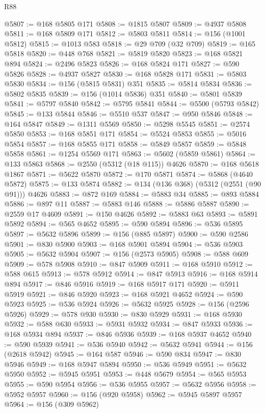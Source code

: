 \begin{lexlean}{R88}
\begin{coremodule}
@5807 := @168 @5805 @171
@5808 := @1815 @5807
@5809 := @4937 @5808
@5811 := @168 @5809 @171
@5812 := @5803 @5811
@5814 := @156 (@1001 @5812)
@5815 := @1013 @583
@5818 := @29 @709 (@32 @709)
@5819 := @165 @5818
@5820 := @448 @768
@5821 := @5819 @5820
@5823 := @168 @5821 @894
@5824 := @2496 @5823
@5826 := @168 @5824 @171
@5827 := @590 @5826
@5828 := @4937 @5827
@5830 := @168 @5828 @171
@5831 := @5803 @5830
@5834 := @156 (@5815 @5831) @351
@5835 := @5814 @5834
@5836 := @5802 @5835
@5839 := @156 (@1014 @5836) @351
@5840 := @5801 @5839
@5841 := @5797 @5840
@5842 := @5795 @5841
@5844 := @5500 (@5793 @5842)
@5845 := @133 @5844
@5846 := @5510 @537
@5847 := @950 @5846
@5848 := @164 @5847
@5849 := @1311 @5569
@5850 := @5298 @5545
@5851 := @2574 @5850
@5853 := @168 @5851 @171
@5854 := @5524 @5853
@5855 := @5016 @5854
@5857 := @168 @5855 @171
@5858 := @5849 @5857
@5859 := @5848 @5858
@5861 := @1254 @5569 @171
@5863 := @5602 (@5859 @5861)
@5864 := @133 @5863
@5868 := @2550 (@5312 (@18 @115)) @4626
@5870 := @168 @5618 @1867
@5871 := @5622 @5870
@5872 := @170 @5871
@5874 := @5868 (@4640 @5872)
@5875 := @133 @5874
@5882 := @134 (@136 @368) (@5312 (@2551 (@90 @91))) @4626
@5883 := @872 @169
@5884 := @5883 @34
@5885 := @893 @5884
@5886 := @897 @11
@5887 := @5883 @146
@5888 := @5886 @5887
@5890 := @2559 @17 @4609
@5891 := @150 @4626
@5892 := @5883 @63
@5893 := @5891 @5892
@5894 := @565 @4652
@5895 := @590 @5894
@5896 := @536 @5895
@5897 := @5632 @5896
@5899 := @156 (@885 @5897)
@5900 := @590 @2586
@5901 := @830 @5900
@5903 := @168 @5901 @5894
@5904 := @536 @5903
@5905 := @5632 @5904
@5907 := @156 (@2573 @5905)
@5908 := @588 @609
@5909 := @578 @5908
@5910 := @847 @5909
@5911 := @168 @5910
@5912 := @588 @615
@5913 := @578 @5912
@5914 := @847 @5913
@5916 := @168 @5914 @894
@5917 := @846 @5916
@5919 := @168 @5917 @171
@5920 := @5911 @5919
@5921 := @846 @5920
@5923 := @168 @5921 @4652
@5924 := @590 @5923
@5925 := @536 @5924
@5926 := @5632 @5925
@5928 := @156 (@2596 @5926)
@5929 := @578 @930
@5930 := @830 @5929
@5931 := @168 @5930
@5932 := @588 @630
@5933 := @5931 @5932
@5934 := @847 @5933
@5936 := @168 @5934 @894
@5937 := @846 @5936
@5939 := @168 @5937 @4652
@5940 := @590 @5939
@5941 := @536 @5940
@5942 := @5632 @5941
@5944 := @156 (@2618 @5942)
@5945 := @164 @587
@5946 := @590 @834
@5947 := @830 @5946
@5949 := @168 @5947 @5894
@5950 := @536 @5949
@5951 := @5632 @5950
@5952 := @5945 @5951
@5953 := @448 @5679
@5954 := @565 @5953
@5955 := @590 @5954
@5956 := @536 @5955
@5957 := @5632 @5956
@5958 := @5952 @5957
@5960 := @156 (@920 @5958)
@5962 := @5945 @5897 @5957
@5964 := @156 (@309 @5962)

\end{coremodule}
\end{lexlean}
